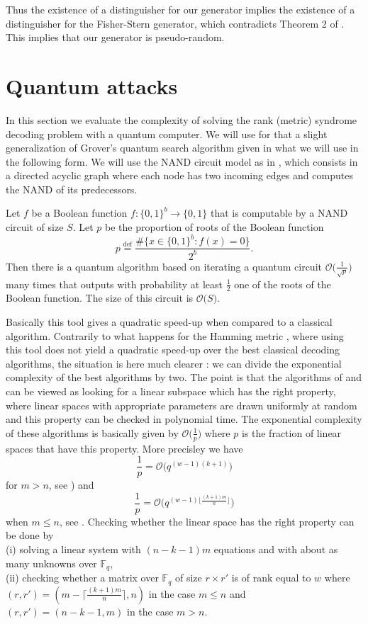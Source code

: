 \documentclass[11pt, a4paper]{llncs}
\newcommand{\eqdef}{\stackrel{\text{def}}{=}}
\newcommand{\Fq}{\mathbb{F}_q}
\newcommand{\OO}[1]{\mathcal{O}\big( #1 \big)}
\begin{document}
Thus the existence of a distinguisher for our generator implies the existence of a distinguisher for the Fisher-Stern generator, which contradicts Theorem 2 of \cite{FS96}. This implies that  our generator is pseudo-random. 

\section{Quantum attacks}

In this section we evaluate the complexity of solving the rank (metric) syndrome decoding problem 
with a quantum computer. We will use for that a slight generalization of Grover's quantum search algorithm
\cite{G96,G97a} given in \cite{BHT98} what we will use in the following form. We will use the NAND circuit model
as in \cite{B10}, which consists in a directed acyclic graph where each node has two incoming edges and computes the NAND of its
predecessors.
\begin{theorem}\label{th:BHT}\cite{BHT98}
Let $f$ be a Boolean function $f:\{0,1\}^b \rightarrow \{0,1\}$ that is computable by a NAND circuit of size $S$. Let $p$ be the proportion of roots of the Boolean function 
$$
p \eqdef \frac{\#\{x \in \{0,1\}^b:f(x)=0\}}{2^b}.$$
Then  there is a quantum algorithm based on iterating a quantum circuit  $\OO{\frac{1}{\sqrt{p}}}$ many times
that outputs with probability at least $\frac{1}{2}$ one of the roots of the Boolean function.
The size of this circuit is $\OO{S}$.
\end{theorem}

Basically this tool gives a quadratic speed-up when compared to a classical algorithm.
Contrarily to what happens for the Hamming metric \cite{B10}, where using this tool does not yield
a quadratic speed-up over the best classical decoding algorithms, the situation is here much clearer :
we can divide the exponential complexity of the best algorithms by two. The point is  that the algorithms of \cite{GRS13}
and \cite{HT15} 
can be viewed as looking for a linear subspace which has the right property, where linear spaces with appropriate parameters are drawn uniformly at random and this property can be checked in polynomial time. 
The exponential complexity of these algorithms is basically given by $\OO{\frac{1}{p}}$ where 
$p$ is the fraction of linear spaces that have this property.
More precisley we have 
$$\frac{1}{p} = \OO{q^{(w-1)(k+1)}}$$ for $m > n$, see \cite{HT15}) and  
$$\frac{1}{p} = \OO{q^{(w-1)\lfloor\frac{(k+1)m}{n}\rfloor}}
$$
when $m \leq n$, see \cite{GRS13}.
Checking whether the linear space has the right property can be
done by \\
(i) solving a linear system with $(n-k-1)m$ equations and with about as many unknowns over $\Fq$, \\
(ii) checking whether  a matrix over $\Fq$ of size $r \times r' $  is of rank equal to $w$
where $(r,r')=(m - \lceil \frac{(k+1)m}{n} \rceil,n)$ in the case $m \leq n$ and 
$(r,r')=(n-k-1,m)$ in the case $m > n$.
\end{document}
